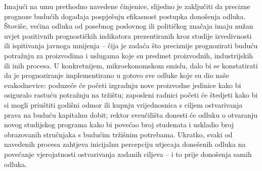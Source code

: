 \documentclass[a4paper,12pt,oneside]{memoir}
\begin{document}
        Imajući na umu prethodno navedene činjenice, slijedno je zaključiti da precizne prognoze budućih događaja pospješuju efikasnost postupka donošenja odluka. Štoviše, većina odluka od posebnog poslovnog ili političkog značaja imaju nužan uvjet pozitivnih prognostičkih indikatora prezentiranih kroz studije izvedivnosti ili ispitivanja javnoga mnijenja -- čija je zadaća što preciznije prognozirati buduću potražnju za proizvodima i uslugama koje su predmet proizvodnih, industrijskih ili inih procesa. U konkretnijem, mikroekonomskom smislu, dalo bi se konstatirati da je prognoziranje implementirano u gotovo sve odluke koje su dio naše svakodnevice: poduzeće će početi izgradnju nove proizvodne jedinice kako bi osiguralo rastuću potražnju na tržištu; zaposleni radnici početi će štedjeti kako bi si mogli priuštiti godišni odmor ili kupnju vrijednosnica s ciljem ostvarivanja prava na buduću kapitalnu dobit; rektor sveučilišta donesti će odluku o otvaranju novog studijskog programa kako bi povećao broj studenata i uskladio broj obrazovanih stručnjaka s budućim tržišnim potrebama. Ukratko, svaki od navedenih procesa zahtjeva inicijalnu percepciju utjecaja donešenih odluka na povećanje vjerojatnosti ostvarivanja zadanih ciljeva -- i to prije donošenja samih odluka.
\end{document}
